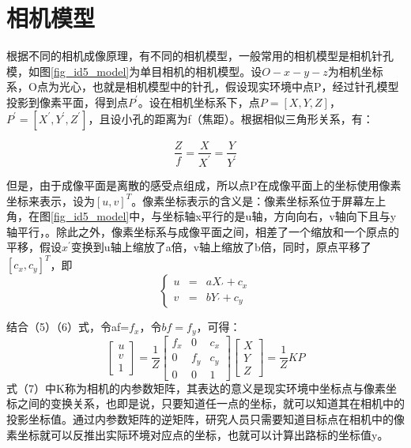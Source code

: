 \documentclass[10.5pt,twocolumn]{jbuaa}
\begin{document}
\section{相机模型}
根据不同的相机成像原理，有不同的相机模型，一般常用的相机模型是相机针孔模，如图\ref{fig_id5_model}为单目相机的相机模型。设$ O-x-y-z $为相机坐标系，O点为光心，也就是相机模型中的针孔，假设现实环境中点P，经过针孔模型投影到像素平面，得到点$ P^{'} $。设在相机坐标系下，点$ P=[X,Y,Z] $，
$ P^{'}=[X^{'},Y^{'},Z^{'}] $，且设小孔的距离为f（焦距）。根据相似三角形关系，有：

\begin{equation}
\label{xiaokong}
\frac{Z}{f} = \frac{X}{X^{'}} = \frac{Y}{Y^{'}}
\end{equation}

但是，由于成像平面是离散的感受点组成，所以点P在成像平面上的坐标使用像素坐标来表示，设为$[u,v]^{T}$。像素坐标表示的含义是：像素坐标系位于屏幕左上角，在图\ref{fig_id5_model}中，与坐标轴x平行的是u轴，方向向右，v轴向下且与y轴平行，。除此之外，像素坐标系与成像平面之间，相差了一个缩放和一个原点的平移，假设$ x^{'} $变换到u轴上缩放了a倍，v轴上缩放了b倍，同时，原点平移了$ [c_{x},c_{y}]^{T} $，即
\begin{equation}
\label{xiangsuzuobiao}
\left\{
\begin{aligned}
u & = & aX_{'}+c_{x} \\
v & = & bY_{'}+c_{y}
\end{aligned}
\right.
\end{equation}

结合（5）（6）式，令af=$ f_{x} $，令$ bf= f_{y} $，可得：
\begin{equation}
\left[\begin{array}{c}
u \\ 
v \\ 
1
\end{array}\right] = \frac{1}{Z}\left[ \begin{array}{ccc}
f_{x} & 0 & c_{x} \\ 
0 & f_{y} & c_{y} \\ 
0 & 0 & 1
\end{array} \right ] \left[\begin{array}{c}
X \\ 
Y \\ 
Z
\end{array} \right] =\frac{1}{Z}KP
\end{equation}
 式（7）中K称为相机的内参数矩阵，其表达的意义是现实环境中坐标点与像素坐标之间的变换关系，也即是说，只要知道任一点的坐标，就可以知道其在相机中的投影坐标值。通过内参数矩阵的逆矩阵，研究人员只需要知道目标点在相机中的像素坐标就可以反推出实际环境对应点的坐标，也就可以计算出路标的坐标值y。
 
\end{document}
